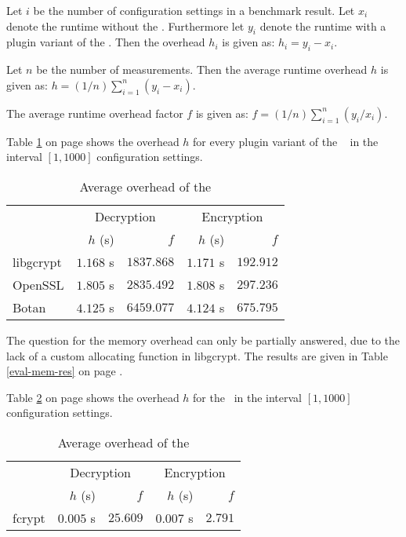 
Let $i$ be the number of configuration settings in a benchmark result.
Let $x_i$ denote the runtime without the \crypto.
Furthermore let $y_i$ denote the runtime with a plugin variant of the \crypto.
Then the overhead $h_i$ is given as: $h_i=y_i - x_i$.

Let $n$ be the number of measurements.
Then the average runtime overhead $h$ is given as: $h=(1/n) \sum_{i=1}^{n}(y_i - x_i)$.

The average runtime overhead factor $f$ is given as: $f=(1/n) \sum_{i=1}^{n}(y_i/x_i)$.

Table \ref{concl-time-crypto} on page \pageref{concl-time-crypto} shows the overhead $h$ for every plugin variant of the \crypto~ in the interval $[1,1000]$ configuration settings.

\begin{table}[h]
\centering
\caption{Average overhead of the \crypto}
\label{concl-time-crypto}
\begin{tabular}{l|rr|rr}
          & \multicolumn{2}{c|}{Decryption} & \multicolumn{2}{c}{Encryption} \\ \cline{2-5}
          & $h$ (s)      & $f$           & $h$ (s)       & $f$          \\ \hline
libgcrypt & $1.168$ s    & $1837.868$    & $1.171$ s     & $192.912$    \\
OpenSSL   & $1.805$ s    & $2835.492$    & $1.808$ s     & $297.236$    \\
Botan     & $4.125$ s    & $6459.077$    & $4.124$ s     & $675.795$
\end{tabular}
\end{table}

The question for the memory overhead can only be partially answered, due to the lack of a custom allocating function in libgcrypt.
The results are given in Table \ref{eval-mem-res} on page \pageref{eval-mem-res}.


Table \ref{concl-time-fcrypt} on page \pageref{concl-time-fcrypt} shows the overhead $h$ for the \fcrypt ~in the interval $[1,1000]$ configuration settings.

\begin{table}[h]
\centering
\caption{Average overhead of the \fcrypt}
\label{concl-time-fcrypt}
\begin{tabular}{l|rr|rr}
          & \multicolumn{2}{c|}{Decryption} & \multicolumn{2}{c}{Encryption} \\ \cline{2-5}
          & $h$ (s)      & $f$           & $h$ (s)       & $f$          \\ \hline
fcrypt    & $0.005$ s    & $25.609$      & $0.007$ s     & $2.791$     
\end{tabular}
\end{table}

